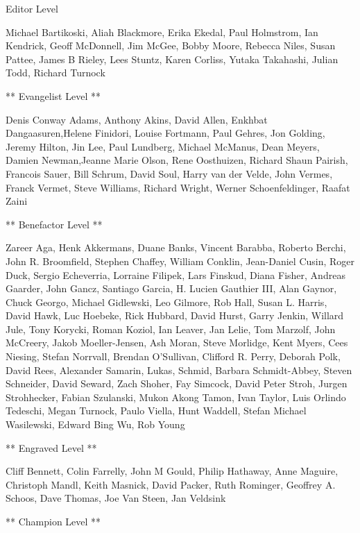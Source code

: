 \documentclass[]{memoir}
\begin{document}
Editor Level

Michael Bartikoski, Aliah Blackmore, Erika Ekedal, Paul Holmstrom, Ian
Kendrick, Geoff McDonnell, Jim McGee, Bobby Moore, Rebecca Niles, Susan
Pattee, James B Rieley, Lees Stuntz, Karen Corliss, Yutaka Takahashi,
Julian Todd, Richard Turnock

** Evangelist Level **

Denis Conway Adams, Anthony Akins, David Allen, Enkhbat
Dangaasuren,Helene Finidori, Louise Fortmann, Paul Gehres, Jon Golding,
Jeremy Hilton, Jin Lee, Paul Lundberg, Michael McManus, Dean Meyers,
Damien Newman,Jeanne Marie Olson, Rene Oosthuizen, Richard Shaun
Pairish, Francois Sauer, Bill Schrum, David Soul, Harry van der Velde,
John Vermes, Franck Vermet, Steve Williams, Richard Wright, Werner
Schoenfeldinger, Raafat Zaini

** Benefactor Level **

Zareer Aga, Henk Akkermans, Duane Banks, Vincent Barabba, Roberto
Berchi, John R. Broomfield, Stephen Chaffey, William Conklin,
Jean-Daniel Cusin, Roger Duck, Sergio Echeverria, Lorraine Filipek, Lars
Finskud, Diana Fisher, Andreas Gaarder, John Gancz, Santiago Garcia, H.
Lucien Gauthier III, Alan Gaynor, Chuck Georgo, Michael Gidlewski, Leo
Gilmore, Rob Hall, Susan L. Harris, David Hawk, Luc Hoebeke, Rick
Hubbard, David Hurst, Garry Jenkin, Willard Jule, Tony Korycki, Roman
Koziol, Ian Leaver, Jan Lelie, Tom Marzolf, John McCreery, Jakob
Moeller-Jensen, Ash Moran, Steve Morlidge, Kent Myers, Cees Niesing,
Stefan Norrvall, Brendan O'Sullivan, Clifford R. Perry, Deborah Polk,
David Rees, Alexander Samarin, Lukas, Schmid, Barbara Schmidt-Abbey,
Steven Schneider, David Seward, Zach Shoher, Fay Simcock, David Peter
Stroh, Jurgen Strohhecker, Fabian Szulanski, Mukon Akong Tamon, Ivan
Taylor, Luis Orlindo Tedeschi, Megan Turnock, Paulo Viella, Hunt
Waddell, Stefan Michael Wasilewski, Edward Bing Wu, Rob Young

** Engraved Level **

Cliff Bennett, Colin Farrelly, John M Gould, Philip Hathaway, Anne
Maguire, Christoph Mandl, Keith Masnick, David Packer, Ruth Rominger,
Geoffrey A. Schoos, Dave Thomas, Joe Van Steen, Jan Veldsink

** Champion Level **
\end{document}
